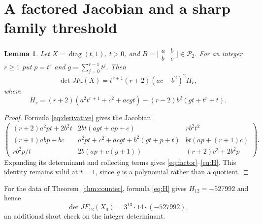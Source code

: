 \documentclass[11pt]{article}
\newtheorem{lemma}[theorem]{Lemma}
\newcommand{\SPD}{\mathcal P_2}
\newcommand{\diag}{\operatorname{diag}}
\begin{document}
\section{A factored Jacobian and a sharp family threshold}
\begin{lemma}\label{lem:factor}
Let $X=\diag(t,1)$, $t>0$, and $B=\bigl[\begin{smallmatrix}a&b\\b&c\end{smallmatrix}\bigr]\in\SPD$. For an integer $r\ge1$ put $p=t^r$ and $g=\sum_{j=0}^{r-1}t^j$. Then
\begin{equation}\label{eq:factor}
\det JF_r(X)=t^{r+1}(r+2)(ac-b^2)^2 H_r,
\end{equation}
where
\begin{equation}\label{eq:H}
H_r=(r+2)(a^2t^{r+1}+c^2+acgt)
       -(r-2)b^2(gt+t^r+t).
\end{equation}
\end{lemma}
\begin{proof}
Formula \eqref{eq:derivative} gives the Jacobian
\[
\begin{pmatrix}
(r+2)a^2pt+2b^2t & 2bt(agt+ap+c) & rb^2t^2\\
(r+1)abp+bc & a^2pt+c^2+acgt+b^2(gt+p+t) & bt(ap+(r+1)c)\\
rb^2p/t & 2b(ap+c(g+1)) & (r+2)c^2+2b^2p
\end{pmatrix}.
\]
Expanding its determinant and collecting terms gives \eqref{eq:factor}--\eqref{eq:H}. This identity remains valid at $t=1$, since $g$ is a polynomial rather than a quotient.
\end{proof}

For the data of Theorem~\ref{thm:counter}, formula \eqref{eq:H} gives $H_{12}=-527992$ and hence
\[
\det JF_{12}(X_0)=3^{13}\cdot14\cdot(-527992),
\]
an additional short check on the integer determinant.
\end{document}
